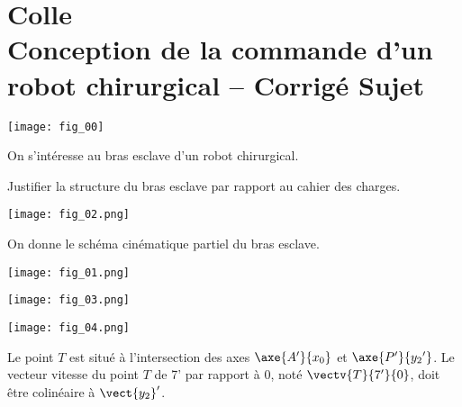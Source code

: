 \chapter*{Colle  \\ 
Conception de la commande d’un robot chirurgical -- 
\ifprof Corrigé \else Sujet \fi}

\iflivret {} \else
\ifprof  {} \else \fi
\fi

\setcounter{question}{0}

\begin{marginfigure}[4cm]
\centering
\texttt{[image: fig\_00]}
\end{marginfigure}







On s'intéresse au bras esclave d'un robot chirurgical. 
\begin{obj}
Justifier la structure du bras esclave par rapport au cahier des charges.
\end{obj}

\begin{center}
\texttt{[image: fig\_02.png]}
\end{center}

On donne le schéma cinématique partiel du bras esclave.

\begin{center}
\texttt{[image: fig\_01.png]}
\end{center}

\begin{center}
\texttt{[image: fig\_03.png]}
\end{center}


\begin{center}
\texttt{[image: fig\_04.png]}
\end{center}

Le point $T$ est situé à l’intersection des axes $\axe{A'}{{x_0}}$ et  $\axe{P'}{{y_2}'}$. 
Le vecteur vitesse du point $T$ de 7’ par rapport à 0, noté $\vectv{T}{7'}{0}$, doit être colinéaire à 
$\vect{y_2}'$.


